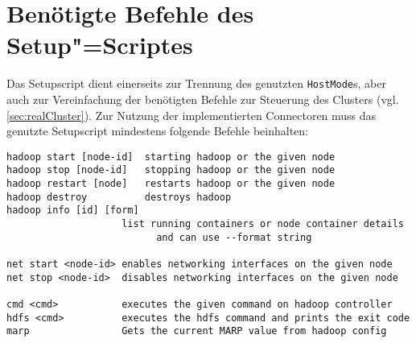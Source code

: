\chapter{Benötigte Befehle des Setup"=Scriptes}
\label{app:setupScriptCmds}

Das Setupscript dient einerseits zur Trennung des genutzten \texttt{HostMode}s, aber auch zur Vereinfachung der benötigten Befehle zur Steuerung des Clusters (vgl. \cref{sec:realCluster}).
Zur Nutzung der implementierten Connectoren muss das genutzte Setupscript mindestens folgende Befehle beinhalten:

\begin{lstlisting}[label=lst:setupscriptHelp,style=plain,
caption={[Benötigte Befehle eines Setupscriptes]
Benötigte Befehle eines Setupscriptes.
Das Setupscript des \mbox{\texttt{Multihost}}"=Modes bietet zum Teil andere Befehle an, besitzt jedoch entsprechende Befehle zur vollständigen Kompatibilität.}]
hadoop start [node-id]  starting hadoop or the given node
hadoop stop [node-id]   stopping hadoop or the given node
hadoop restart [node]   restarts hadoop or the given node
hadoop destroy          destroys hadoop
hadoop info [id] [form]
                    list running containers or node container details
                          and can use --format string

net start <node-id> enables networking interfaces on the given node
net stop <node-id>  disables networking interfaces on the given node

cmd <cmd>           executes the given command on hadoop controller
hdfs <cmd>          executes the hdfs command and prints the exit code
marp                Gets the current MARP value from hadoop config
\end{lstlisting}

